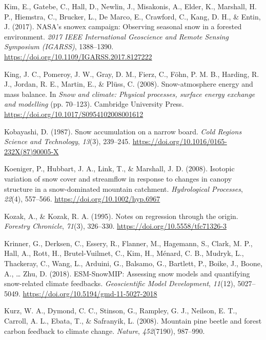 \documentclass[
  letterpaper,
]{tex/uofsthesis-cs}
\newlength{\cslhangindent}
\newenvironment{CSLReferences}[2] %
 {\begin{list}{}{%
  \setlength{\itemindent}{0pt}
  \setlength{\leftmargin}{0pt}
  \setlength{\parsep}{0pt}
  \ifodd #1
   \setlength{\leftmargin}{\cslhangindent}
   \setlength{\itemindent}{-1\cslhangindent}
  \fi
  \setlength{\itemsep}{#2\baselineskip}}}
 {\end{list}}
\begin{document}
\begin{CSLReferences}{1}{0}
Kim, E., Gatebe, C., Hall, D., Newlin, J., Misakonis, A., Elder, K.,
Marshall, H. P., Hiemstra, C., Brucker, L., De Marco, E., Crawford, C.,
Kang, D. H., \& Entin, J. (2017). {NASA}'s snowex campaign: {Observing}
seasonal snow in a forested environment. \emph{2017 {IEEE} International
Geoscience and Remote Sensing Symposium ({IGARSS})}, 1388--1390.
\url{https://doi.org/10.1109/IGARSS.2017.8127222}

King, J. C., Pomeroy, J. W., Gray, D. M., Fierz, C., Föhn, P. M. B.,
Harding, R. J., Jordan, R. E., Martin, E., \& Plüss, C. (2008).
Snow-atmosphere energy and mass balance. In \emph{Snow and climate:
{Physical} processes, surface energy exchange and modelling} (pp.
70--123). Cambridge University Press.
\url{https://doi.org/10.1017/S0954102008001612}

Kobayashi, D. (1987). Snow accumulation on a narrow board. \emph{Cold
Regions Science and Technology}, \emph{13}(3), 239--245.
\url{https://doi.org/10.1016/0165-232X(87)90005-X}

Koeniger, P., Hubbart, J. A., Link, T., \& Marshall, J. D. (2008).
Isotopic variation of snow cover and streamflow in response to changes
in canopy structure in a snow-dominated mountain catchment.
\emph{Hydrological Processes}, \emph{22}(4), 557--566.
\url{https://doi.org/10.1002/hyp.6967}

Kozak, A., \& Kozak, R. A. (1995). Notes on regression through the
origin. \emph{Forestry Chronicle}, \emph{71}(3), 326--330.
\url{https://doi.org/10.5558/tfc71326-3}

Krinner, G., Derksen, C., Essery, R., Flanner, M., Hagemann, S., Clark,
M. P., Hall, A., Rott, H., Brutel-Vuilmet, C., Kim, H., Ménard, C. B.,
Mudryk, L., Thackeray, C., Wang, L., Arduini, G., Balsamo, G., Bartlett,
P., Boike, J., Boone, A., \ldots{} Zhu, D. (2018). {ESM-SnowMIP}:
{Assessing} snow models and quantifying snow-related climate feedbacks.
\emph{Geoscientific Model Development}, \emph{11}(12), 5027--5049.
\url{https://doi.org/10.5194/gmd-11-5027-2018}

Kurz, W. A., Dymond, C. C., Stinson, G., Rampley, G. J., Neilson, E. T.,
Carroll, A. L., Ebata, T., \& Safranyik, L. (2008). Mountain pine beetle
and forest carbon feedback to climate change. \emph{Nature},
\emph{452}(7190), 987--990.


\end{CSLReferences}
\end{document}
